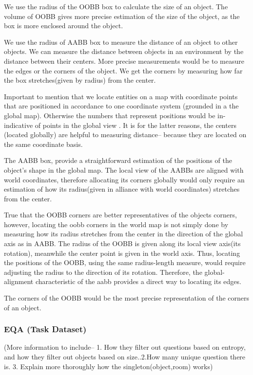 We use the radius of the OOBB box to calculate the size of an object. The volume of OOBB gives more precise estimation of the size of the object, as the box is more enclosed around the object.

We use the radius of AABB box to measure the distance of an object to other objects. We can measure the distance between objects in an environment by the distance between their centers. More precise measurements would be to measure the edges or the corners of the object. We get the corners by measuring how far the box stretches(given by radius) from the center.  

Important to mention that we locate entities on a map with coordinate points that are positioned in accordance to one coordinate system (grounded in a the global map). Otherwise the numbers that represent positions would be in-indicative of points in the global view . It is for the latter reasons, the centers (located globally) are helpful to measuring distance-- because they are located on the same coordinate basis.  

The AABB box, provide a straightforward estimation of the positions of the object's shape in the global map. The local view of the AABBs are aligned with world coordinates, therefore allocating its corners globally would only require an estimation of how its radius(given in alliance with world coordinates) stretches from the center.

True that the OOBB corners are better representatives of the objects corners, however, locating the oobb corners in the world map is not simply done by measuring how its radius stretches from the center in the direction of  the global axis as in AABB. The radius of the OOBB is given along its local view axis(its rotation), meanwhile the center point is given in the world axis. Thus, locating the positions of the OOBB, using the same radius-length measure, would require adjusting the radius to the direction of its rotation. Therefore, the global-alignment characteristic of the aabb provides a direct way to locating its edges.  


The corners of the OOBB would be the most precise representation of the corners of an object. 



\subsubsection{EQA (Task Dataset)}

(More information to include-- 1. How they filter out questions based on entropy, and how they filter out objects based on size..2.How many unique question there is. 3. Explain more thoroughly how the singleton(object,room) works) 

